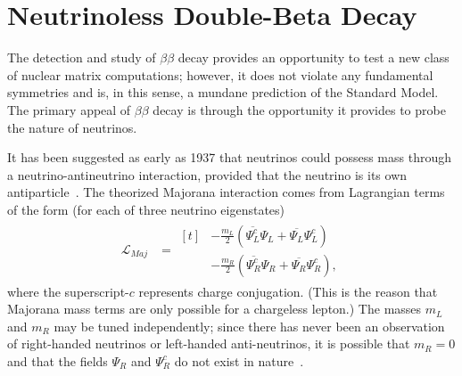 \section{Neutrinoless Double-Beta Decay}

The detection and study of $\beta\beta$ decay provides an opportunity to test a new class of nuclear matrix computations; however, it does not violate any fundamental symmetries and is, in this sense, a mundane prediction of the Standard Model.  The primary appeal of $\beta\beta$ decay is through the opportunity it provides to probe the nature of neutrinos.

It has been suggested as early as 1937 that neutrinos could possess mass through a neutrino-antineutrino interaction, provided that the neutrino is its own antiparticle~\cite{Majorana}.  The theorized Majorana interaction comes from Lagrangian terms of the form (for each of three neutrino eigenstates)
\begin{align}
\mathcal{L}_{Maj}&= \begin{aligned}[t]
 & -\frac{m_{L}}{2} \left( \overline{\Psi_L^c} \Psi_L^{} + \overline{\Psi_L^{}} \Psi_L^c \right)\\
 & -\frac{m_{R}}{2} \left( \overline{\Psi_R^c} \Psi_R^{} + \overline{\Psi_R^{}} \Psi_R^c \right),
\end{aligned}
\end{align}
where the superscript-$c$ represents charge conjugation.  (This is the reason that Majorana mass terms are only possible for a chargeless lepton.)  The masses $m_L$ and $m_R$ may be tuned independently; since there has never been an observation of right-handed neutrinos or left-handed anti-neutrinos, it is possible that $m_R = 0$ and that the fields $\Psi_R^{}$ and $\Psi_R^c$ do not exist in nature~\cite{RMPbb0n}.

